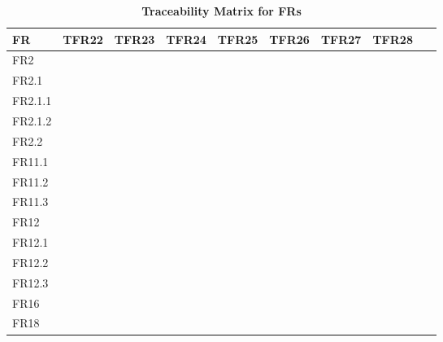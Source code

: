 \documentclass[12pt, titlepage]{article}
\begin{document}
\newpage
\FloatBarrier
    \begin{table}
    \begin{tabular}{|l|cccccccc|}
	\hline
	\textbf{FR}&TFR22&TFR23&TFR24&TFR25&TFR26&TFR27&TFR28&~\\
	\hline
	FR2&&&&&&&\checkmark&~\\
	FR2.1&&&&&&&\checkmark&~\\
	FR2.1.1&&&&&&&\checkmark&~\\
	FR2.1.2&&&&&&&\checkmark&~\\
	FR2.2&&&&&&&\checkmark&~\\
	FR11.1&\checkmark&&&&&&&~\\
	FR11.2&&\checkmark&&&&&&~\\
	FR11.3&&&\checkmark&&&&&~\\
	FR12&&&&\checkmark&&&\checkmark&~\\
	FR12.1&&&&&&&\checkmark&~\\
	FR12.2&&&&&&&\checkmark&~\\
	FR12.3&&&&&&&\checkmark&~\\
	FR16&&&&&\checkmark&&&~\\
	FR18&&&&&&\checkmark&&~\\
	\hline
	\end{tabular}
	\caption{\bf Traceability Matrix for FRs}
	\end{table}
        
\end{document}
